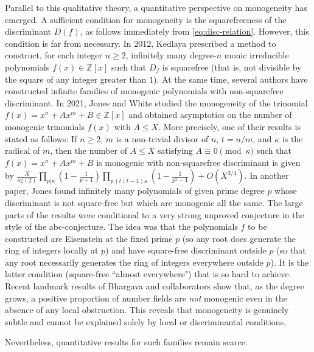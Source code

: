 \documentclass[table]{amsart}
\newcommand{\Z}{\mathbb{Z}}
\numberwithin{equation}{section}
\begin{document}
Parallel to this qualitative theory, a quantitative perspective on monogeneity has emerged.
A sufficient condition for monogeneity is the squarefreeness of the discriminant $D(f)$, as follows immediately from \eqref{eq:disc-relation}.
However, this condition is far from necessary. In 2012, Kedlaya \cite{kedlaya} prescribed a method to construct, for each integer $n \geq 2$, infinitely many degree-$n$ monic irreducible polynomials $f(x) \in \Z[x]$ such that $D_f$ is squarefree (that is, not divisible by the square of any integer greater than $1$). At the same time, several authors have constructed infinite families of monogenic polynomials with non-squarefree discriminant. In 2021, Jones and White \cite{L3} studied the monogeneity of the trinomial $f(x)=x^n+Ax^m+B\in \Z[x]$ and obtained asymptotics on the number of monogenic trinomials $f(x)$ with $A\leq X$. More precisely, one of their results is stated as follows: If $n\geq 2$, $m$ is a non-trivial divisor of $n$, $t=n/m$, and $\kappa$ is the radical of $m$, then the number of $A\leq X$ satisfying $A\equiv 0 \pmod \kappa$ such that $f(x)=x^n+Ax^m+B$ is monogenic with non-squarefree discriminant is given by $\frac{X}{\kappa\zeta(2)}\prod\limits_{p|\kappa}(1-\frac{1}{p+1})\prod\limits_{p\nmid t(t-1)\kappa}(1-\frac{1}{p^2-1})+O(X^{3/4}).$
In another paper, Jones \cite{L1} found infinitely many polynomials of given prime degree $p$ whose discriminant is not square-free but which are monogenic all the same. The large parts of the results were conditional to a very strong unproved conjecture in the style of the abc-conjecture. The idea was that the polynomials $f$ to be constructed are Eisenstein at the fixed prime $p$ (so any root does generate the ring of integers locally at $p$) and have square-free discriminant outside $p$ (so that any root necessarily generates the ring of integers everywhere outside $p$). It is the latter condition (square-free ``almost everywhere") that is so hard to achieve.
Recent landmark results of Bhargava and collaborators \cite{Manjulcubic, Manjulquartic} show that, as the degree grows, a positive proportion of number fields are \emph{not} monogenic even in the absence of any local obstruction.
This reveals that monogeneity is genuinely subtle and cannot be explained solely by local or discriminantal conditions.

Nevertheless, quantitative results for such families remain scarce.
\end{document}
